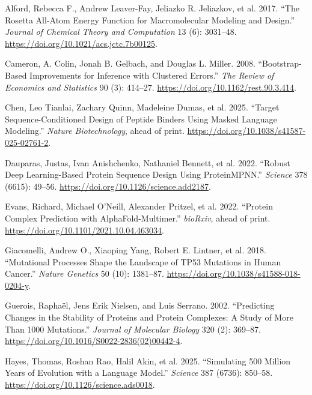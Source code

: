 \documentclass[
  11pt,
  us-letterpaper,
  DIV=11,
  numbers=noendperiod]{scrartcl}
\newlength{\cslhangindent}
\newenvironment{CSLReferences}[2] %
 {\begin{list}{}{%
  \setlength{\itemindent}{0pt}
  \setlength{\leftmargin}{0pt}
  \setlength{\parsep}{0pt}
  \ifodd #1
   \setlength{\leftmargin}{\cslhangindent}
   \setlength{\itemindent}{-1\cslhangindent}
  \fi
  \setlength{\itemsep}{#2\baselineskip}}}
 {\end{list}}
\begin{document}
\protect{}\label{refs}
\begin{CSLReferences}{1}{1}
Alford, Rebecca F., Andrew Leaver-Fay, Jeliazko R. Jeliazkov, et al.
2017. {``The {Rosetta} All-Atom Energy Function for Macromolecular
Modeling and Design.''} \emph{Journal of Chemical Theory and
Computation} 13 (6): 3031--48.
\url{https://doi.org/10.1021/acs.jctc.7b00125}.

Cameron, A. Colin, Jonah B. Gelbach, and Douglas L. Miller. 2008.
{``Bootstrap-Based Improvements for Inference with Clustered Errors.''}
\emph{The Review of Economics and Statistics} 90 (3): 414--27.
\url{https://doi.org/10.1162/rest.90.3.414}.

Chen, Leo Tianlai, Zachary Quinn, Madeleine Dumas, et al. 2025.
{``Target Sequence-Conditioned Design of Peptide Binders Using Masked
Language Modeling.''} \emph{Nature Biotechnology}, ahead of print.
\url{https://doi.org/10.1038/s41587-025-02761-2}.

Dauparas, Justas, Ivan Anishchenko, Nathaniel Bennett, et al. 2022.
{``Robust Deep Learning-Based Protein Sequence Design Using
{ProteinMPNN}.''} \emph{Science} 378 (6615): 49--56.
\url{https://doi.org/10.1126/science.add2187}.

Evans, Richard, Michael O'Neill, Alexander Pritzel, et al. 2022.
{``Protein Complex Prediction with {AlphaFold-Multimer}.''}
\emph{bioRxiv}, ahead of print.
\url{https://doi.org/10.1101/2021.10.04.463034}.

Giacomelli, Andrew O., Xiaoping Yang, Robert E. Lintner, et al. 2018.
{``Mutational Processes Shape the Landscape of {TP53} Mutations in Human
Cancer.''} \emph{Nature Genetics} 50 (10): 1381--87.
\url{https://doi.org/10.1038/s41588-018-0204-y}.

Guerois, Raphaël, Jens Erik Nielsen, and Luis Serrano. 2002.
{``Predicting Changes in the Stability of Proteins and Protein
Complexes: A Study of More Than 1000 Mutations.''} \emph{Journal of
Molecular Biology} 320 (2): 369--87.
\url{https://doi.org/10.1016/S0022-2836(02)00442-4}.

Hayes, Thomas, Roshan Rao, Halil Akin, et al. 2025. {``Simulating 500
Million Years of Evolution with a Language Model.''} \emph{Science} 387
(6736): 850--58. \url{https://doi.org/10.1126/science.ads0018}.


\end{CSLReferences}
\end{document}
